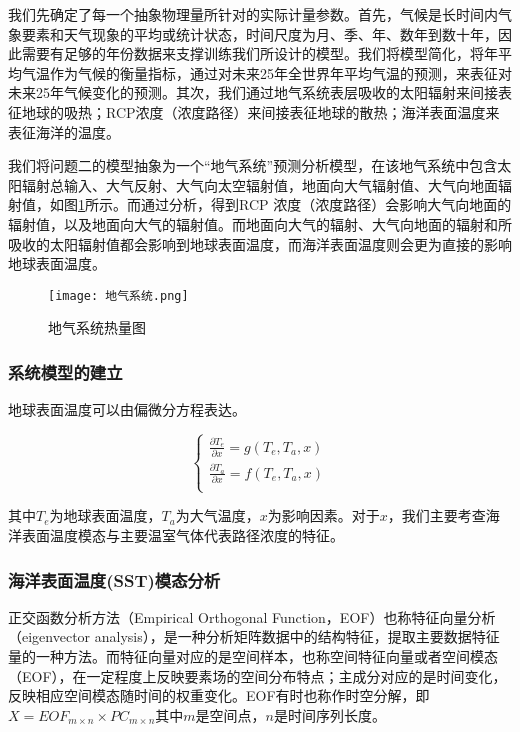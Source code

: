 \documentclass[bwprint]{gmcmthesis}
\begin{document}
我们先确定了每一个抽象物理量所针对的实际计量参数。首先，气候是长时间内气象要素和天气现象的平均或统计状态，时间尺度为月、季、年、数年到数十年，因此需要有足够的年份数据来支撑训练我们所设计的模型。我们将模型简化，将年平均气温作为气候的衡量指标，通过对未来25年全世界年平均气温的预测，来表征对未来25年气候变化的预测。其次，我们通过地气系统表层吸收的太阳辐射来间接表征地球的吸热；RCP浓度（浓度路径）来间接表征地球的散热；海洋表面温度来表征海洋的温度。

我们将问题二的模型抽象为一个“地气系统”预测分析模型，在该地气系统中包含太阳辐射总输入、大气反射、大气向太空辐射值，地面向大气辐射值、大气向地面辐射值，如图\ref{ea_sys}所示。而通过分析，得到RCP 浓度（浓度路径）会影响大气向地面的辐射值，以及地面向大气的辐射值。而地面向大气的辐射、大气向地面的辐射和所吸收的太阳辐射值都会影响到地球表面温度，而海洋表面温度则会更为直接的影响地球表面温度\cite{Mochizuki2010Pacific}。

\begin{figure}[ht]
\centering
\texttt{[image: 地气系统.png]}
\caption{地气系统热量图}\label{ea_sys}
\end{figure}

\subsubsection{系统模型的建立}

地球表面温度可以由偏微分方程表达。

\begin{equation}
\left\{
\begin{array}{c}
\frac{\partial {T_e}}{\partial {x}} = g(T_e, T_a, x) \\
\frac{\partial {T_a}}{\partial {x}} = f(T_e, T_a, x) \\
\end{array}
\right. 
\end{equation}

其中$T_e$为地球表面温度，$T_a$为大气温度，$x$为影响因素。对于$x$，我们主要考查海洋表面温度模态与主要温室气体代表路径浓度的特征。

\subsubsection{海洋表面温度(SST)模态分析}

正交函数分析方法（Empirical Orthogonal Function，EOF）也称特征向量分析（eigenvector analysis），是一种分析矩阵数据中的结构特征，提取主要数据特征量的一种方法。而特征向量对应的是空间样本，也称空间特征向量或者空间模态（EOF），在一定程度上反映要素场的空间分布特点；主成分对应的是时间变化，反映相应空间模态随时间的权重变化。EOF有时也称作时空分解，即$X = EOF_{m \times n} \times PC_{m \times n}$其中$m$是空间点，$n$是时间序列长度。
\end{document}
